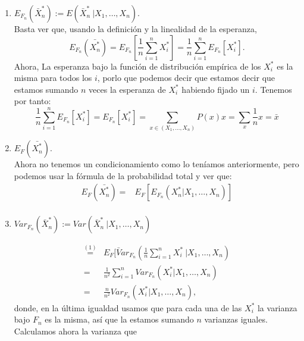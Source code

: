 \documentclass[a4paper]{article}
\begin{document}
   \begin{enumerate}

     \item \(E_{F_n}( \bar X_n^* ):= E(\bar X_n^* \ | X_1,\dots,X_n)\).\\

  Basta ver que, usando la definición y la linealidad de la esperanza,
  \[
  E_{F_n}\left( \bar{X^*_n}\right) = E_{F_n}\left[\frac{1}{n} \sum_{i=1}^n X_i^* \right] = \frac{1}{n} \sum_{i=1}^n E_{F_n} \left[X_i^*\right].
  \]
  Ahora, La esperanza bajo la función de distribución empírica de los \( X_i^*\) es la misma para todos los \(i\), porlo que podemos decir que estamos decir que estamos sumando \(n\) veces la esperanza de \(X_i^*\) habiendo fijado un \(i\). Tenemos por tanto:
  \[
  \frac{1}{n} \sum_{i=1}^n E_{F_n} \left[X_i^*\right] = E_{F_n}\left[X_i^*\right] = \sum_{x \in (X_1,\dots,X_n)} P(x) x  = \sum_x \frac{1}{n} x = \bar x
  \]

\item \(E_F(\bar{X_n^*})\).\\

  Ahora no tenemos un condicionamiento como lo teníamos anteriormente, pero podemos usar la fórmula de la probabilidad total y ver que:
  \begin{align*}
    E_F(\bar{X_n^*}) = & E_F \left[ E_{F_n} \left( X_n^* | X_1,\dots, X_n\right) \right]\\
  \end{align*}

\item \(Var_{F_n}\left(\bar X_n^*\right) := Var(\bar X_n^* \ | X_1,\dots, X_n)\)

  \begin{align*}
    \stackrel{(1)}{=} & E_F[\bar Var_{F_n}\left(\frac{1}{n} \sum_{i=1}^n X_i^* \ | X_1,\dots,X_n\right)\\
     = & \frac{1}{n^2} \sum_{i=1}^n Var_{F_n}(X_i^* | X_1,\dots, X_n ) \\
     = & \frac{n}{n^2} Var_{F_n}(X_i^* | X_1,\dots,X_n),
  \end{align*}
  donde, en la última igualdad usamos que para cada una de las \(X_i^*\) la varianza bajo \(F_n\) es la misma, así que la estamos sumando \(n\) varianzas iguales. Calculamos ahora la varianza que 

\end{enumerate}
\end{document}

